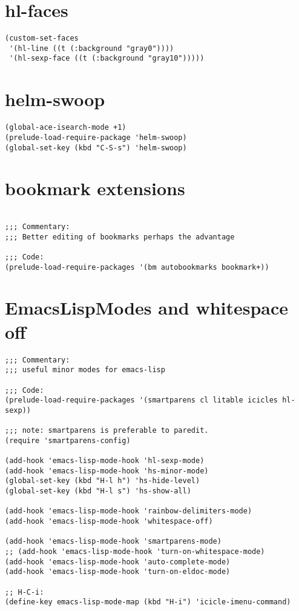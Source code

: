 \documentclass[11pt]{article}
\begin{document}
\section{hl-faces}
\label{sec:org6c69c1c}

\begin{verbatim}
(custom-set-faces
 '(hl-line ((t (:background "gray0"))))
 '(hl-sexp-face ((t (:background "gray10")))))
\end{verbatim}

\section{helm-swoop}
\label{sec:org7138813}

\begin{verbatim}
(global-ace-isearch-mode +1)
(prelude-load-require-package 'helm-swoop)
(global-set-key (kbd "C-S-s") 'helm-swoop)
\end{verbatim}

\section{bookmark extensions}
\label{sec:org180d0c9}

\begin{verbatim}

;;; Commentary:
;;; Better editing of bookmarks perhaps the advantage

;;; Code:
(prelude-load-require-packages '(bm autobookmarks bookmark+))

\end{verbatim}

\section{EmacsLispModes and whitespace off}
\label{sec:org1ae87ba}

\begin{verbatim}
;;; Commentary:
;;; useful minor modes for emacs-lisp

;;; Code:
(prelude-load-require-packages '(smartparens cl litable icicles hl-sexp))

;;; note: smartparens is preferable to paredit.
(require 'smartparens-config)

(add-hook 'emacs-lisp-mode-hook 'hl-sexp-mode)
(add-hook 'emacs-lisp-mode-hook 'hs-minor-mode)
(global-set-key (kbd "H-l h") 'hs-hide-level)
(global-set-key (kbd "H-l s") 'hs-show-all)

(add-hook 'emacs-lisp-mode-hook 'rainbow-delimiters-mode)
(add-hook 'emacs-lisp-mode-hook 'whitespace-off)

(add-hook 'emacs-lisp-mode-hook 'smartparens-mode)
;; (add-hook 'emacs-lisp-mode-hook 'turn-on-whitespace-mode)
(add-hook 'emacs-lisp-mode-hook 'auto-complete-mode)
(add-hook 'emacs-lisp-mode-hook 'turn-on-eldoc-mode)

;; H-C-i:
(define-key emacs-lisp-mode-map (kbd "H-i") 'icicle-imenu-command)
\end{verbatim}
\end{document}
